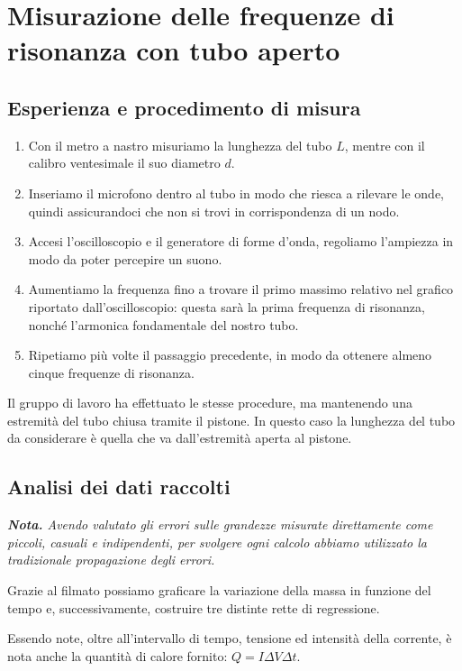 \documentclass{article}
\begin{document}
\pagebreak
\section{Misurazione delle frequenze di risonanza con tubo aperto}

\subsection{Esperienza e procedimento di misura}

\begin{enumerate}
  \item
    Con il metro a nastro misuriamo la lunghezza del tubo $L$, mentre con il
    calibro ventesimale il suo diametro $d$. %
  \item
    Inseriamo il microfono dentro al tubo in modo che riesca a rilevare le onde,
    quindi assicurandoci che non si trovi in corrispondenza di un nodo.
  \item
    Accesi l'oscilloscopio e il generatore di forme d'onda, regoliamo
    l'ampiezza in modo da poter percepire un suono.
  \item
    Aumentiamo la frequenza fino a trovare il primo massimo relativo nel
    grafico riportato dall'oscilloscopio: questa sarà la prima frequenza
    di risonanza, nonché l'armonica fondamentale del nostro tubo.
  \item
    Ripetiamo più volte il passaggio precedente, in modo da ottenere almeno
    cinque frequenze di risonanza.
\end{enumerate}
Il gruppo di lavoro ha effettuato le stesse procedure, ma mantenendo una
estremità del tubo chiusa tramite il pistone. In questo caso la lunghezza
del tubo da considerare è quella che va dall'estremità aperta al pistone.

\subsection{Analisi dei dati raccolti}
\emph{\textbf{Nota.}
Avendo valutato gli errori sulle grandezze misurate direttamente
come piccoli, casuali e indipendenti, per svolgere ogni calcolo
abbiamo utilizzato la tradizionale propagazione degli errori.
}

  Grazie al filmato possiamo graficare la variazione della massa in funzione del tempo
  e, successivamente, costruire tre distinte rette di regressione.

  Essendo note, oltre all'intervallo di tempo, tensione ed intensità della corrente,
  è nota anche la quantità di calore fornito: $Q = I \Delta V \Delta t$.
\end{document}
